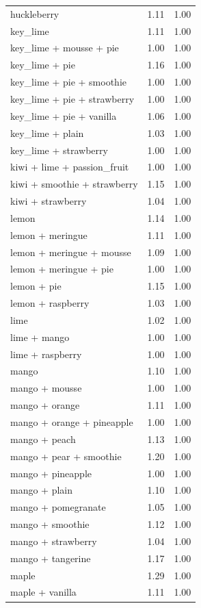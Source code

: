 \begin{table}
\begin{tabular}{lrr}
huckleberry & 1.11 & 1.00 \\
key\_lime & 1.11 & 1.00 \\
key\_lime + mousse + pie & 1.00 & 1.00 \\
key\_lime + pie & 1.16 & 1.00 \\
key\_lime + pie + smoothie & 1.00 & 1.00 \\
key\_lime + pie + strawberry & 1.00 & 1.00 \\
key\_lime + pie + vanilla & 1.06 & 1.00 \\
key\_lime + plain & 1.03 & 1.00 \\
key\_lime + strawberry & 1.00 & 1.00 \\
kiwi + lime + passion\_fruit & 1.00 & 1.00 \\
kiwi + smoothie + strawberry & 1.15 & 1.00 \\
kiwi + strawberry & 1.04 & 1.00 \\
lemon & 1.14 & 1.00 \\
lemon + meringue & 1.11 & 1.00 \\
lemon + meringue + mousse & 1.09 & 1.00 \\
lemon + meringue + pie & 1.00 & 1.00 \\
lemon + pie & 1.15 & 1.00 \\
lemon + raspberry & 1.03 & 1.00 \\
lime & 1.02 & 1.00 \\
lime + mango & 1.00 & 1.00 \\
lime + raspberry & 1.00 & 1.00 \\
mango & 1.10 & 1.00 \\
mango + mousse & 1.00 & 1.00 \\
mango + orange & 1.11 & 1.00 \\
mango + orange + pineapple & 1.00 & 1.00 \\
mango + peach & 1.13 & 1.00 \\
mango + pear + smoothie & 1.20 & 1.00 \\
mango + pineapple & 1.00 & 1.00 \\
mango + plain & 1.10 & 1.00 \\
mango + pomegranate & 1.05 & 1.00 \\
mango + smoothie & 1.12 & 1.00 \\
mango + strawberry & 1.04 & 1.00 \\
mango + tangerine & 1.17 & 1.00 \\
maple & 1.29 & 1.00 \\
maple + vanilla & 1.11 & 1.00 \\

\end{tabular}
\end{table}
